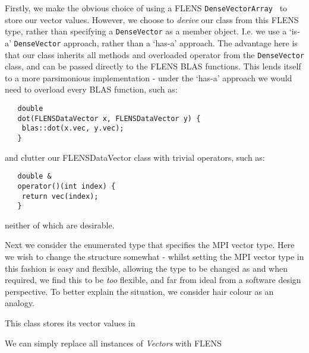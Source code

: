 Firstly, we make the obvious choice of using a FLENS \texttt{DenseVector\<Array\<\double\> \>} to store our vector values. However, we choose to \emph{derive} our class from this FLENS type, rather than specifying a \texttt{DenseVector} as a member object. I.e. we use a `is-a' \texttt{DenseVector} approach, rather than a `has-a' approach. The advantage here is that our class inherits all methods and overloaded operator from the \texttt{DenseVector} class, and can be passed directly to the FLENS BLAS functions. This lends itself to a more parsimonious implementation - under the `has-a' approach we would need to overload every BLAS function, such as: 
\begin{lstlisting}
   double
   dot(FLENSDataVector x, FLENSDataVector y) {
   	blas::dot(x.vec, y.vec);
   }
\end{lstlisting}

and clutter our FLENSDataVector class with trivial operators, such as:

\begin{lstlisting}
   double &
   operator()(int index) {
   	return vec(index);
   }
\end{lstlisting}

neither of which are desirable.

Next we consider the enumerated type that specifies the MPI vector type. Here we wish to change the structure somewhat - whilst setting the MPI vector type in this fashion is easy and flexible, allowing the type to be changed as and when required, we find this to be \emph{too} flexible, and far from ideal from a software design perspective. To better explain the situation, we consider hair colour as an analogy. 



This class stores its vector values in 



We can simply replace all instances of \emph{Vectors} with FLENS 
